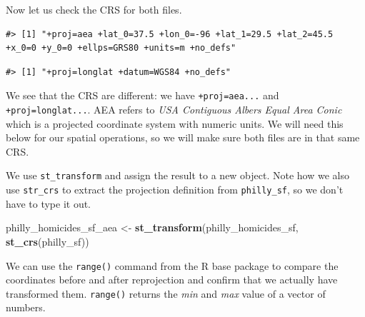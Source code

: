 \documentclass[
]{book}
\newenvironment{Shaded}{\begin{snugshade}}{\end{snugshade}}
\newcommand{\CommentTok}[1]{\textcolor[rgb]{0.56,0.35,0.01}{\textit{#1}}}
\newcommand{\FunctionTok}[1]{\textcolor[rgb]{0.13,0.29,0.53}{\textbf{#1}}}
\newcommand{\NormalTok}[1]{#1}
\newcommand{\OtherTok}[1]{\textcolor[rgb]{0.56,0.35,0.01}{#1}}
\newcommand{\SpecialCharTok}[1]{\textcolor[rgb]{0.81,0.36,0.00}{\textbf{#1}}}
\begin{document}
Now let us check the CRS for both files.

\begin{Shaded}
\end{Shaded}

\begin{verbatim}
#> [1] "+proj=aea +lat_0=37.5 +lon_0=-96 +lat_1=29.5 +lat_2=45.5 +x_0=0 +y_0=0 +ellps=GRS80 +units=m +no_defs"
\end{verbatim}

\begin{Shaded}
\end{Shaded}

\begin{verbatim}
#> [1] "+proj=longlat +datum=WGS84 +no_defs"
\end{verbatim}

We see that the CRS are different: we have \texttt{+proj=aea...} and \texttt{+proj=longlat...}. AEA refers to \emph{USA Contiguous Albers Equal Area Conic} which is a projected coordinate system with numeric units. We will need this below for our spatial operations, so we will make sure both files are in that same CRS.

We use \texttt{st\_transform} and assign the result to a new object. Note how we also use \texttt{str\_crs} to extract the projection definition from \texttt{philly\_sf}, so we don't have to type it out.

\begin{Shaded}
\begin{Highlighting}[]
\NormalTok{philly\_homicides\_sf\_aea }\OtherTok{\textless{}{-}} \FunctionTok{st\_transform}\NormalTok{(philly\_homicides\_sf, }\FunctionTok{st\_crs}\NormalTok{(philly\_sf))}
\end{Highlighting}
\end{Shaded}

We can use the \texttt{range()} command from the R base package to compare the coordinates before and after reprojection and confirm that we actually have transformed them. \texttt{range()} returns the \emph{min} and \emph{max} value of a vector of numbers.
\end{document}
